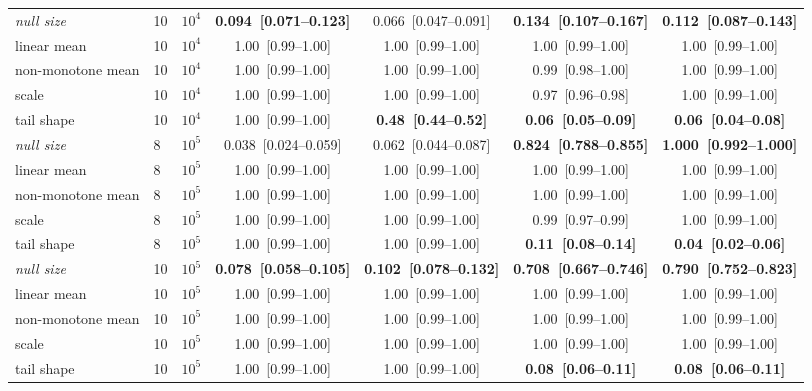 {\begin{tabular}{llrcccc}
\midrule
\emph{null size} & 10 & $10^4$ & \textbf{0.094~[0.071--0.123]} & 0.066~[0.047--0.091] & \textbf{0.134~[0.107--0.167]} & \textbf{0.112~[0.087--0.143]} \\
linear mean & 10 & $10^4$ & 1.00~[0.99--1.00] & 1.00~[0.99--1.00] & 1.00~[0.99--1.00] & 1.00~[0.99--1.00] \\
non-monotone mean & 10 & $10^4$ & 1.00~[0.99--1.00] & 1.00~[0.99--1.00] & 0.99~[0.98--1.00] & 1.00~[0.99--1.00] \\
scale & 10 & $10^4$ & 1.00~[0.99--1.00] & 1.00~[0.99--1.00] & 0.97~[0.96--0.98] & 1.00~[0.99--1.00] \\
tail shape & 10 & $10^4$ & 1.00~[0.99--1.00] & \textbf{0.48~[0.44--0.52]} & \textbf{0.06~[0.05--0.09]} & \textbf{0.06~[0.04--0.08]} \\
\midrule
\emph{null size} & 8 & $10^5$ & 0.038~[0.024--0.059] & 0.062~[0.044--0.087] & \textbf{0.824~[0.788--0.855]} & \textbf{1.000~[0.992--1.000]} \\
linear mean & 8 & $10^5$ & 1.00~[0.99--1.00] & 1.00~[0.99--1.00] & 1.00~[0.99--1.00] & 1.00~[0.99--1.00] \\
non-monotone mean & 8 & $10^5$ & 1.00~[0.99--1.00] & 1.00~[0.99--1.00] & 1.00~[0.99--1.00] & 1.00~[0.99--1.00] \\
scale & 8 & $10^5$ & 1.00~[0.99--1.00] & 1.00~[0.99--1.00] & 0.99~[0.97--0.99] & 1.00~[0.99--1.00] \\
tail shape & 8 & $10^5$ & 1.00~[0.99--1.00] & 1.00~[0.99--1.00] & \textbf{0.11~[0.08--0.14]} & \textbf{0.04~[0.02--0.06]} \\
\midrule
\emph{null size} & 10 & $10^5$ & \textbf{0.078~[0.058--0.105]} & \textbf{0.102~[0.078--0.132]} & \textbf{0.708~[0.667--0.746]} & \textbf{0.790~[0.752--0.823]} \\
linear mean & 10 & $10^5$ & 1.00~[0.99--1.00] & 1.00~[0.99--1.00] & 1.00~[0.99--1.00] & 1.00~[0.99--1.00] \\
non-monotone mean & 10 & $10^5$ & 1.00~[0.99--1.00] & 1.00~[0.99--1.00] & 1.00~[0.99--1.00] & 1.00~[0.99--1.00] \\
scale & 10 & $10^5$ & 1.00~[0.99--1.00] & 1.00~[0.99--1.00] & 1.00~[0.99--1.00] & 1.00~[0.99--1.00] \\
tail shape & 10 & $10^5$ & 1.00~[0.99--1.00] & 1.00~[0.99--1.00] & \textbf{0.08~[0.06--0.11]} & \textbf{0.08~[0.06--0.11]} \\
\bottomrule
\end{tabular}}

